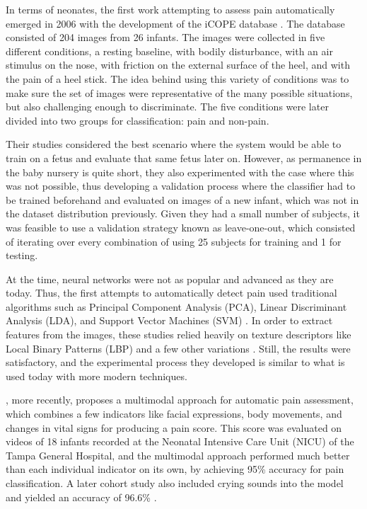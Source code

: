 In terms of neonates, the first work attempting to assess pain automatically emerged in 2006 with the development of the iCOPE database \citep{Brahnam2006}. The database consisted of 204 images from 26 infants. The images were collected in five different conditions, a resting baseline, with bodily disturbance, with an air stimulus on the nose, with friction on the external surface of the heel, and with the pain of a heel stick. The idea behind using this variety of conditions was to make sure the set of images were representative of the many possible situations, but also challenging enough to discriminate. The five conditions were later divided into two groups for classification: pain and non-pain.

Their studies considered the best scenario where the system would be able to train on a fetus and evaluate that same fetus later on. However, as permanence in the baby nursery is quite short, they also experimented with the case where this was not possible, thus developing a validation process where the classifier had to be trained beforehand and evaluated on images of a new infant, which was not in the dataset distribution previously. Given they had a small number of subjects, it was feasible to use a validation strategy known as leave-one-out, which consisted of iterating over every combination of using 25 subjects for training and 1 for testing. 

At the time, neural networks were not as popular and advanced as they are today. Thus, the first attempts to automatically detect pain used traditional algorithms such as Principal Component Analysis (PCA), Linear Discriminant Analysis (LDA), and Support Vector Machines (SVM) \citep{BrahnamCSS05, Brahnam2006, BrahnamNS08}. In order to extract features from the images, these studies relied heavily on texture descriptors like Local Binary Patterns (LBP) and a few other variations \cite{Nanni2010}. Still, the results were satisfactory, and the experimental process they developed is similar to what is used today with more modern techniques. 

\cite{ZamzamiPGKAS16}, more recently, proposes a multimodal approach for automatic pain assessment, which combines a few indicators like facial expressions, body movements, and changes in vital signs for producing a pain score. This score was evaluated on videos of 18 infants recorded at the Neonatal Intensive Care Unit (NICU) of the Tampa General Hospital, and the multimodal approach performed much better than each individual indicator on its own, by achieving 95\% accuracy for pain classification. A later cohort study also included crying sounds into the model and yielded an accuracy of 96.6\% \citep{Zamzmi2017}.

